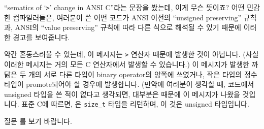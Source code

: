 \begin{faq}
        ``sematics of `\verb+>+' change in ANSI C''라는 문장을 봤는데,
        이게 무슨 뜻이죠?
\A
        어떤 민감한 컴파일러들은, 여러분이 쓴 어떤 코드가 ANSI 이전의 
        ``unsigned preserving'' 규칙과, ANSI의 ``value preserving'' 규칙에
        따라 다른 식으로 해석될 수 있기 때문에 이러한 경고를 보여줍니다.

        약간 혼동스러울 수 있는데, 이 메시지는 \verb+>+ 연산자 때문에 발생한 것이 아닙니다.     
        (사실 이러한 메시지는 거의 모든 C 연산자에서 발생할 수 있습니다.) 이 메시지가
        발생한 까닭은 두 개의 서로 다른 타입이 binary operator의 양쪽에 쓰였거나,
        작은 타입의 정수 타입이 promote되어야 할 경우에 발생합니다.
        (만약에 여러분이 생각할 때, 코드에서 unsigned 타입을 쓴 적이 없다고 생각되면,
        대부분은  때문에 이 메시지가 나왔을 것입니다. 표준 C에 따르면, 
        은 \verb+size_t+ 타입을 리턴하며, 이 것은 unsigned 타입입니다.
        
        질문 를 보기 바랍니다.
\end{faq}

